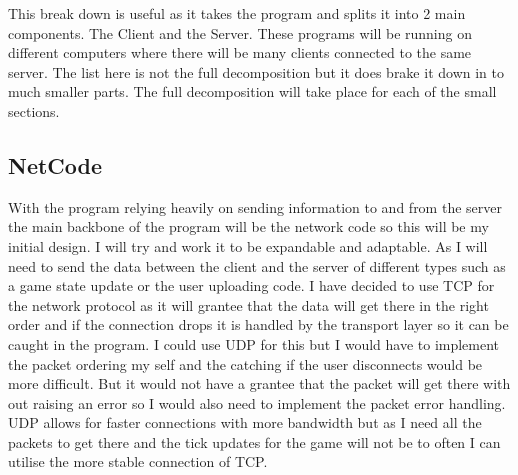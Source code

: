 \documentclass[12pt]{article}
\begin{document}
\renewcommand*\DTstylecomment{\rmfamily\color{green}\textsc}
\renewcommand*\DTstyle{\ttfamily\textcolor{black}}
This break down is useful as it takes the program and splits it into 2 main components. The Client and the Server. These programs will be running on different computers where there will be many clients connected to the same server.
The list here is not the full decomposition but it does brake it down in to much smaller parts. The full decomposition will take place for each of the small sections.

\subsection{NetCode}
With the program relying heavily on sending information to and from the server the main backbone of the program will be the network code so this will be my initial design. I will try and work it to be expandable and adaptable. As I will need to send the data between the client and the server of different types such as a game state update or the user uploading code. I have decided to use TCP for the network protocol as it will grantee that the data will get there in the right order and if the connection drops it is handled by the transport layer so it can be caught in the program.
I could use UDP for this but I would have to implement the packet ordering my self and the catching if the user disconnects would be more difficult. But it would not have a grantee that the packet will get there with out raising an error so I would also need to implement the packet error handling.
UDP allows for faster connections with more bandwidth but as I need all the packets to get there and the tick updates for the game will not be to often I can utilise the more stable connection of TCP.
\end{document}
